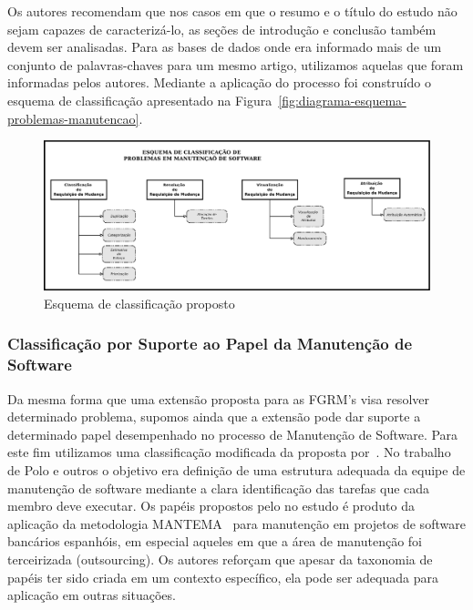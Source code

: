 Os autores recomendam que nos casos em que o resumo e o
título do estudo não sejam capazes de caracterizá-lo, as seções de introdução e
conclusão também devem ser analisadas. Para as bases de dados onde era informado mais de um conjunto
de palavras-chaves para um mesmo artigo, utilizamos aquelas que foram informadas pelos autores. Mediante a aplicação do processo foi
construído o esquema de classificação apresentado na Figura~\ref{fig:diagrama-esquema-problemas-manutencao}.

\begin{figure}[htpb]
	\centering
	\includegraphics[width=0.8\linewidth]{./chapter-mapeamento-sistematico/img/diagrama-esquema-problemas-manutencao.pdf}
	\caption{Esquema de classificação proposto}
	\label{fig:digrama-esquema-problemas-manutencao}
\end{figure}

\subsubsection{Classificação por Suporte ao Papel da Manutenção de Software}
\label{subsubsec:map-esquema-suporte-papel-man}

Da mesma forma que uma extensão proposta para as FGRM's visa resolver determinado
problema, supomos ainda que a extensão pode dar suporte a determinado papel desempenhado no processo
de Manutenção de Software. Para este fim utilizamos uma classificação modificada da proposta
por~\cite{Polo1999}. No trabalho de Polo e outros o objetivo era definição de uma estrutura adequada
da equipe de manutenção de software mediante a clara identificação das tarefas que cada membro deve
executar. Os papéis propostos pelo no estudo é produto da aplicação da metodologia MANTEMA~\cite{756695} para
manutenção em projetos de software bancários espanhóis, em especial aqueles em que a área de
manutenção foi terceirizada (outsourcing). Os autores reforçam que apesar da taxonomia de papéis ter
sido criada em um contexto específico, ela pode ser adequada para aplicação em outras situações.

